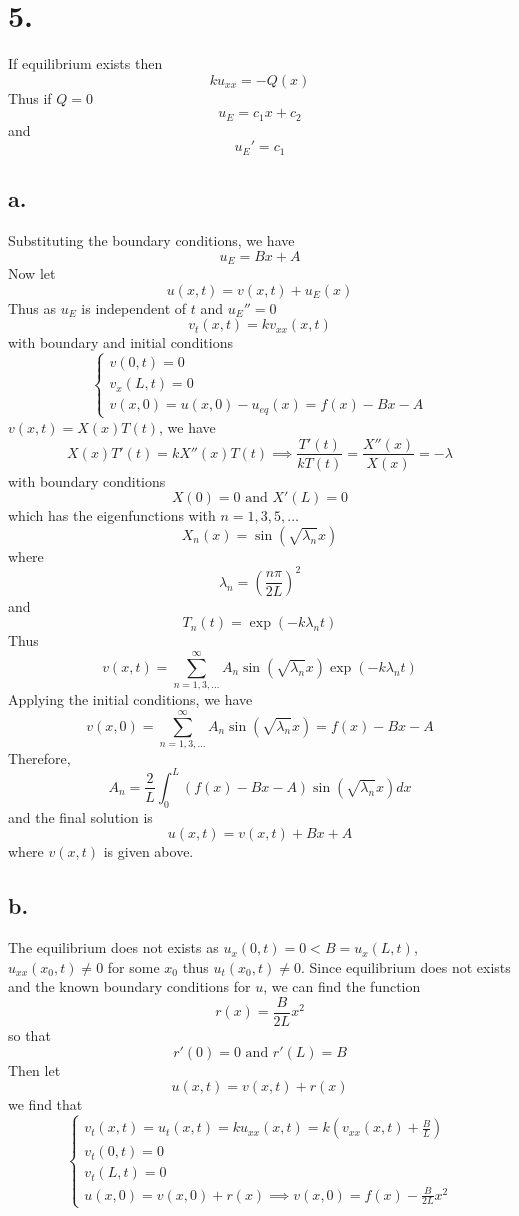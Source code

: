 \documentclass[11pt]{article}
\theoremstyle{mystyle}
\theoremstyle{definition}
\begin{document}
\section*{5.}
If equilibrium exists then 
\[
  ku_{xx} = - Q(x)
\]
Thus if $Q = 0$ 
\[
  u_{E} = c_1 x + c_2
\]
and 
\[
  u_{E}' = c_1
\]
\subsection*{a.}
Substituting the boundary conditions, we have  
\[
  u_{E} = Bx + A
\]
Now let 
\[
  u(x,t) = v(x,t) + u_E(x)
\]
Thus as $u_E$ is independent of $t$ and $u_E'' = 0$
\[
  v_t(x,t) = k v_{xx}(x,t)
\]
with boundary and initial conditions  
\[
  \begin{cases}
    v(0,t) = 0 \\
    v_x(L,t) = 0 \\
    v(x,0) = u(x,0) - u_{eq}(x) = f(x) - Bx - A
  \end{cases}
\]
$v(x,t) = X(x) T(t)$, we have 
\[
  X(x)T'(t) = k X''(x)T(t) \implies \displaystyle\frac{T'(t)}{kT(t)} = \displaystyle\frac{X''(x)}{X(x)} = -\lambda
\]
with boundary conditions
\[
  X(0) = 0 \text{ and } X'(L) = 0
\]
which has the eigenfunctions with $n=1,3,5, \hdots$ 
\[
  X_n(x) = \sin(\sqrt{\lambda_n }x)
\]
where 
\[
  \lambda_n = \left(\displaystyle\frac{n\pi}{2L}\right)^2
\]
and 
\[
  T_n(t) = \exp(-k\lambda_n t)
\]
Thus 
\[
  v(x,t) = \sum_{n = 1,3,\hdots}^\infty A_n \sin(\sqrt{\lambda_n}x)\exp(-k\lambda_n t)
\]
Applying the initial conditions, we have 
\[
  v(x,0) = \sum_{n=1,3,\hdots}^\infty A_n \sin(\sqrt{\lambda_n}x) = f(x) - Bx - A
\]
Therefore, 
\[
  A_n = \displaystyle\frac{2}{L} \int_0^L (f(x) - Bx - A) \sin(\sqrt{\lambda_n}x) dx
\]
and the final solution is 
\[
  u(x,t) = v(x,t) + Bx + A 
\]
where $v(x,t)$ is given above. 
\subsection*{b.}
The equilibrium does not exists as $u_x(0,t) = 0 < B = u_x(L,t)$, $u_{xx}(x_0,t) \ne 0$ for some $x_0$ thus $u_t(x_0, t) \ne 0$. Since equilibrium does not exists and the known boundary conditions for $u$, we can find the function 
\[
  r(x) = \displaystyle\frac{B}{2L}x^2 
\]
so that 
\[
  r'(0) = 0 \text{ and } r'(L) = B
\]
Then let
\[
  u(x,t) = v(x,t) + r(x)
\]
we find that 
\[
  \begin{cases}
    v_t(x,t) = u_t(x,t) = ku_{xx}(x,t) = k(v_{xx}(x,t) + \displaystyle\frac{B}{L}) \\
    v_t(0,t) = 0 \\
    v_t(L,t) = 0 \\
    u(x,0) = v(x,0) + r(x) \implies v(x,0) = f(x) - \displaystyle\frac{B}{2L}x^2
  \end{cases}
\]
\end{document}
